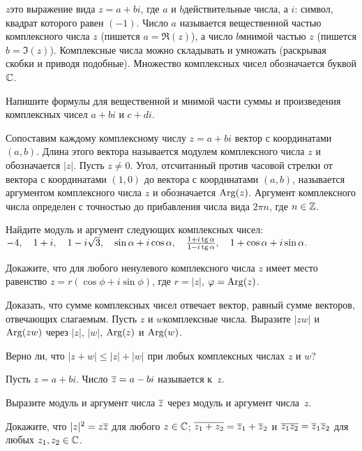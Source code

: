 \documentclass[a4paper,12pt]{article}
\begin{document}

  $z$\т это выражение вида $z=a+bi$, где $a$ и $b$\т действительные числа, а $i$\т : символ, квадрат которого равен $(-1)$. Число $a$ называется вещественной частью комплексного числа $z$
(пишется $a=\Re(z)$), а число $b$\т мнимой частью $z$ (пишется $b=\Im(z)$). Комплексные числа можно складывать и умножать ( раскрывая скобки и приводя подобные). Множество комплексных чисел обозначается буквой $\mathbb{C}$.

Напишите формулы для вещественной и мнимой части суммы и произведения
комплексных чисел $a+bi$ и $c+di$.

Сопоставим каждому комплексному числу $z=a+bi$ вектор с координатами $(a,b)$. Длина этого вектора называется  модулем комплексного числа $z$ и обозначается $|z|$.
Пусть $z\ne0$. Угол, отсчитанный против часовой стрелки от вектора с координатами $(1,0)$ до вектора с координатами $(a,b)$, называется  аргументом комплексного числа $z$ и обозначается $\operatorname{Arg}(z)$. Аргумент комплексного числа определен с точностью до прибавления числа вида $2\pi n$, где $n\in\mathbb{Z}$.

Найдите модуль и аргумент следующих комплексных чисел:\\
$
-4,\quad
1+i,\quad
1-i\sqrt{3},\quad
\sin\alpha + i\cos\alpha,\quad
\frac{1+i\tg\alpha}{1-i\tg\alpha},\quad
1+\cos\alpha+i\sin\alpha.
$

Докажите, что для любого ненулевого комплексного числа $z$ имеет место равенство $z=r(\cos\phi + i\sin\phi)$, где $r=|z|$, $\varphi=\operatorname{Arg}(z)$.

Доказать, что сумме комплексных чисел отвечает вектор, равный сумме векторов, отвечающих слагаемым.
Пусть $z$ и $w$\т комплексные числа. Выразите $|zw|$ и $\operatorname{Arg}(zw)$ через $|z|$, $|w|$, $\operatorname{Arg}(z)$ и $\operatorname{Arg}(w)$.

Верно ли, что $|z+w|\leq|z|+|w|$ при любых комплексных числах $z$ и $w$?

Пусть $z=a+bi$. Число $\overline z=a-bi$ называется  к~$z$.

Выразите модуль и аргумент числа $\overline z$  через модуль и аргумент числа~$z$.

Докажите, что
$|z|^2=z\overline z$ для любого $z\in\mathbb{C}$;
$\overline{z_1+z_2}=\overline z_1 + \overline z_2$ и $\overline{z_1z_2}=\overline z_1 \overline z_2$ для любых $z_1,z_2\in\mathbb{C}$.
\end{document}

